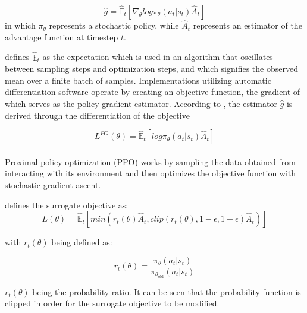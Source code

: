 \begin{equation}
    \hat{g} = \hat{\mathbb{E}}_{t} [\nabla_{\theta} log \pi_{\theta}(a_t | s_t) \hat{A}_{t}]    
\end{equation}
in which $\pi_{\theta}$ represents a stochastic policy, while $\hat{A}_{t}$ represents an estimator of the advantage function at timestep $t$.

\cite{schulman2017ppo} defines $\hat{\mathbb{E}}_{t}$ as the expectation which is used in an algorithm that oscillates between sampling steps and optimization steps, and which signifies the observed mean over a finite batch of samples. Implementations utilizing automatic differentiation software operate by creating an objective function, the gradient of which serves as the policy gradient estimator. According to \cite{schulman2017ppo}, the estimator $\hat{g}$ is derived through the differentiation of the objective

\begin{equation}
    L^{PG} (\theta) = \hat{\mathbb{E}}_{t} [log \pi_{\theta}(a_t | s_t) \hat{A}_{t}]
\end{equation}

\paragraph{}
Proximal policy optimization (PPO) works by sampling the data obtained from interacting with its environment and then optimizes the objective function with stochastic gradient ascent.

\cite{shao2019survey} defines the surrogate objective as:
\begin{equation}
    L(\theta) = \hat{\mathbb{E}}_{t} [min(r_t(\theta) \hat{A}_{t}, clip(r_t(\theta), 1-\epsilon, 1+\epsilon) \hat{A}_{t})]
\end{equation}

with $r_t(\theta)$ being defined as:

\begin{equation}
    r_t(\theta) = \frac{\pi_{\theta} (a_t | s_t)}{\pi_{\theta_{\text{old}}} (a_t | s_t)}
\end{equation}

$r_t(\theta)$ being the probability ratio. It can be seen that the probability function is clipped in order for the surrogate objective to be modified.


